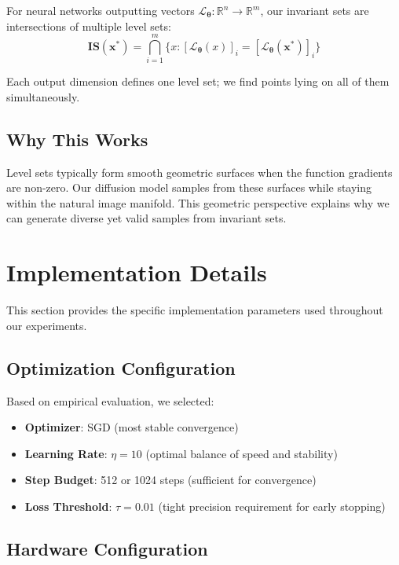 \documentclass[licencjacka,en]{pracamgr}
\begin{document}
For neural networks outputting vectors $\mathcal{L}_{\boldsymbol{\theta}}: \mathbb{R}^n \rightarrow \mathbb{R}^m$, our invariant sets are intersections of multiple level sets:
\begin{equation}
\mathbf{IS}(\mathbf{x^*}) = \bigcap_{i=1}^m \{x : [\mathcal{L}_{\boldsymbol{\theta}}(x)]_i = [\mathcal{L}_{\boldsymbol{\theta}}(\mathbf{x^*})]_i\}
\end{equation}

Each output dimension defines one level set; we find points lying on all of them simultaneously.

\subsection{Why This Works}

Level sets typically form smooth geometric surfaces when the function gradients are non-zero. Our diffusion model samples from these surfaces while staying within the natural image manifold. This geometric perspective explains why we can generate diverse yet valid samples from invariant sets.

\section{Implementation Details}\label{appendix:implementation}

This section provides the specific implementation parameters used throughout our experiments.

\subsection{Optimization Configuration}

Based on empirical evaluation, we selected:
\begin{itemize}
\item \textbf{Optimizer}: SGD (most stable convergence)
\item \textbf{Learning Rate}: $\eta = 10$ (optimal balance of speed and stability)
\item \textbf{Step Budget}: 512 or 1024 steps (sufficient for convergence)
\item \textbf{Loss Threshold}: $\tau = 0.01$ (tight precision requirement for early stopping)
\end{itemize}

\subsection{Hardware Configuration}
\end{document}
